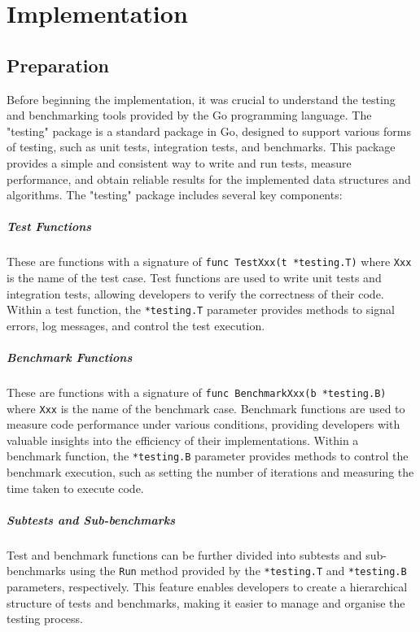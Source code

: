 \chapter{Implementation} %
\label{chap:implementation}

\section{Preparation}
Before beginning the implementation, it was crucial to understand the testing and benchmarking tools provided by the Go programming language. The "testing" package is a standard package in Go, designed to support various forms of testing, such as unit tests, integration tests, and benchmarks. This package provides a simple and consistent way to write and run tests, measure performance, and obtain reliable results for the implemented data structures and algorithms.
The "testing" package includes several key components:

\paragraph{Test Functions}
These are functions with a signature of \lstinline{func TestXxx(t *testing.T)} where \lstinline{Xxx} is the name of the test case. Test functions are used to write unit tests and integration tests, allowing developers to verify the correctness of their code. Within a test function, the \lstinline{*testing.T} parameter provides methods to signal errors, log messages, and control the test execution.

\paragraph{Benchmark Functions}
These are functions with a signature of \lstinline{func BenchmarkXxx(b *testing.B)} where \lstinline{Xxx} is the name of the benchmark case. Benchmark functions are used to measure code performance under various conditions, providing developers with valuable insights into the efficiency of their implementations. Within a benchmark function, the \lstinline{*testing.B} parameter provides methods to control the benchmark execution, such as setting the number of iterations and measuring the time taken to execute code.

\paragraph{Subtests and Sub-benchmarks}
Test and benchmark functions can be further divided into subtests and sub-benchmarks using the \lstinline{Run} method provided by the \lstinline{*testing.T} and \lstinline{*testing.B} parameters, respectively. This feature enables developers to create a hierarchical structure of tests and benchmarks, making it easier to manage and organise the testing process.

